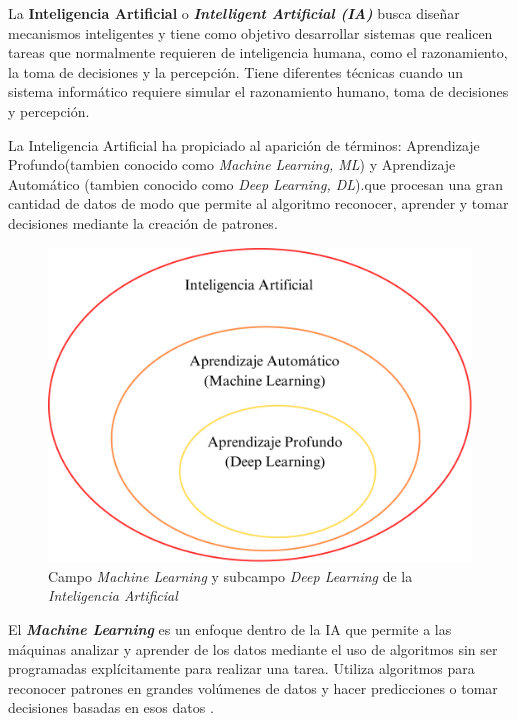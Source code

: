  
La \textbf{Inteligencia Artificial } o \textbf{\textit{Intelligent Artificial (IA)}} busca diseñar mecanismos inteligentes y tiene como objetivo desarrollar sistemas que realicen tareas que normalmente requieren de inteligencia humana, como el razonamiento, la toma de decisiones y la percepción. Tiene diferentes técnicas cuando un sistema informático requiere simular el razonamiento humano, toma de decisiones y percepción\cite{iaunam}.

La Inteligencia Artificial ha propiciado al aparición de términos: Aprendizaje Profundo(tambien conocido como \textit{Machine Learning, ML}) y Aprendizaje Automático (tambien conocido como \textit{Deep Learning, DL}).que procesan una gran cantidad de datos de modo que permite al algoritmo reconocer, aprender y tomar decisiones mediante la creación de patrones\cite{avila2020plant}\cite{centeno2019deep}. 
%

    \begin{figure}[H]
        \centering
        \includegraphics[width=0.5\linewidth]{Documento/Imagenes/Marco Teorico/CamposysubcamposIA.pdf}
        \caption{Campo \textit{Machine Learning} y subcampo \textit{Deep Learning} de la \textit{Inteligencia Artificial}}
        \label{fig:MLDL}
    \end{figure}

El \textbf{\textit{Machine Learning}} es un enfoque dentro de la IA que permite a las máquinas analizar y aprender de los datos mediante el uso de algoritmos sin ser programadas explícitamente para realizar una tarea. Utiliza algoritmos para reconocer patrones en grandes volúmenes de datos y hacer predicciones o tomar decisiones basadas en esos datos \cite{sanchez2020evaluacion}.  

